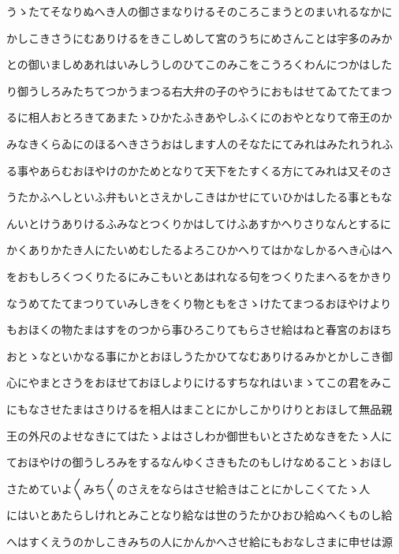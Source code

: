 \documentclass[a4paper,11pt,landscape]{ltjtarticle}
\begin{document}
\par\medskip
うゝたてそなりぬへき人の御さまなりけるそのころこまうとのまいれるなかに
\par\medskip
かしこきさうにむありけるをきこしめして宮のうちにめさんことは宇多のみか
\par\medskip
との御いましめあれはいみしうしのひてこのみこをこうろくわんにつかはした
\par\medskip
り御うしろみたちてつかうまつる右大弁の子のやうにおもはせてゐてたてまつ
\par\medskip
るに相人おとろきてあまたゝひかたふきあやしふくにのおやとなりて帝王のか
\par\medskip
みなきくらゐにのほるへきさうおはします人のそなたにてみれはみたれうれふ
\par\medskip
る事やあらむおほやけのかためとなりて天下をたすくる方にてみれは又そのさ
\par\medskip
うたかふへしといふ弁もいとさえかしこきはかせにていひかはしたる事ともな
\par\medskip
んいとけうありけるふみなとつくりかはしてけふあすかへりさりなんとするに
\par\medskip
かくありかたき人にたいめむしたるよろこひかへりてはかなしかるへき心はへ
\par\medskip
をおもしろくつくりたるにみこもいとあはれなる句をつくりたまへるをかきり
\par\medskip
なうめてたてまつりていみしきをくり物ともをさゝけたてまつるおほやけより
\par\medskip
もおほくの物たまはすをのつから事ひろこりてもらさせ給はねと春宮のおほち
\par\medskip
おとゝなといかなる事にかとおほしうたかひてなむありけるみかとかしこき御
\par\medskip
心にやまとさうをおほせておほしよりにけるすちなれはいまゝてこの君をみこ
\par\medskip
にもなさせたまはさりけるを相人はまことにかしこかりけりとおほして無品親
\par\medskip
王の外尺のよせなきにてはたゝよはさしわか御世もいとさためなきをたゝ人に
\par\medskip
ておほやけの御うしろみをするなんゆくさきもたのもしけなめることゝおほし
\par\medskip
さためていよ〱みち〱のさえをならはさせ給きはことにかしこくてたゝ人
\par\medskip
にはいとあたらしけれとみことなり給なは世のうたかひおひ給ぬへくものし給
\par\medskip
へはすくえうのかしこきみちの人にかんかへさせ給にもおなしさまに申せは源
\end{document}
